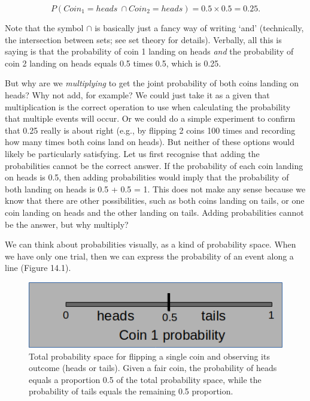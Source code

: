 \documentclass[
]{scrbook}
\begin{document}
\[P(Coin_{1} = heads\:\cap Coin_{2} = heads) = 0.5 \times 0.5 = 0.25.\]

Note that the symbol \(\cap\) is basically just a fancy way of writing `and' (technically, the intersection between sets; see set theory for details).
Verbally, all this is saying is that the probability of coin 1 landing on heads \emph{and} the probability of coin 2 landing on heads equals 0.5 times 0.5, which is 0.25.

But why are we \emph{multiplying} to get the joint probability of both coins landing on heads?
Why not add, for example?
We could just take it as a given that multiplication is the correct operation to use when calculating the probability that multiple events will occur.
Or we could do a simple experiment to confirm that 0.25 really is about right (e.g., by flipping 2 coins 100 times and recording how many times both coins land on heads).
But neither of these options would likely be particularly satisfying.
Let us first recognise that adding the probabilities cannot be the correct answer.
If the probability of each coin landing on heads is 0.5, then adding probabilities would imply that the probability of both landing on heads is 0.5 + 0.5 = 1.
This does not make any sense because we know that there are other possibilities, such as both coins landing on tails, or one coin landing on heads and the other landing on tails.
Adding probabilities cannot be the answer, but why multiply?

We can think about probabilities visually, as a kind of probability space.
When we have only one trial, then we can express the probability of an event along a line (Figure 14.1).

\begin{figure}
\includegraphics[width=1\linewidth]{img/coin1_probability} \caption{Total probability space for flipping a single coin and observing its outcome (heads or tails). Given a fair coin, the probability of heads equals a proportion 0.5 of the total probability space, while the probability of tails equals the remaining 0.5 proportion.}\label{fig:unnamed-chunk-53}
\end{figure}
\end{document}
